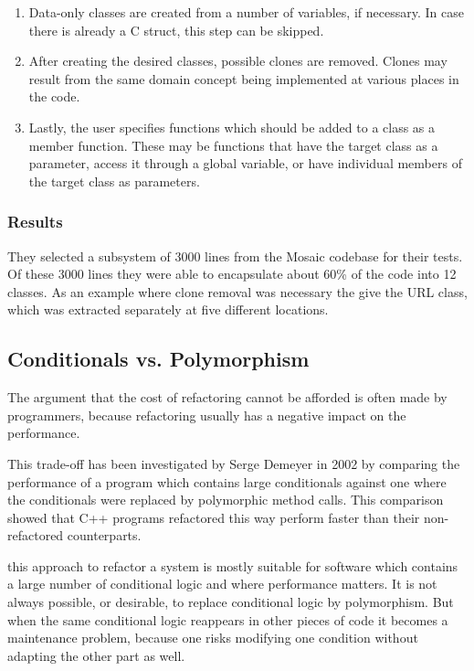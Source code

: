 \documentclass[conference,compsoc,a4paper]{IEEEtran}
\newcommand{\code}[1]{{\small\ttfamily #1}}
\begin{document}
	\begin{enumerate}
		\item Data-only classes are created from a number of variables, if necessary. In case there is already a C 
		\code{struct}, this step can be skipped.
		
		\item After creating the desired classes, possible clones are removed. Clones may result from the same domain concept 
		being implemented at various places in the code.
		
		\item Lastly, the user specifies functions which should be added to a class as a member function. These may be 
		functions that have the target class as a parameter, access it through a global variable, or have individual members 
		of the target class as parameters.
	\end{enumerate}
	
	\subsubsection{Results}
	
	They selected a subsystem of 3000 lines from the Mosaic codebase for their tests. Of these 3000 lines they were able to 
	encapsulate about 60\% of the code into 12 classes. As an example where clone removal was necessary the give the URL 
	class, which was extracted separately at five different locations.
	
	\subsection{Conditionals vs. Polymorphism}
	
	The argument that the cost of refactoring cannot be afforded is often made by programmers, because refactoring usually 
	has a negative impact on the performance.
	
	This trade-off has been investigated by Serge Demeyer in 2002 \cite{polymorphism} by comparing the performance of a 
	program which contains large conditionals against one where the conditionals were replaced by polymorphic method calls. 
	This comparison showed that C++ programs refactored this way perform faster than their non-refactored counterparts.
	
	this approach to refactor a system is mostly suitable for software which contains a large number of conditional logic 
	and where performance matters. It is not always possible, or desirable, to replace conditional logic by polymorphism. 
	But when the same conditional logic reappears in other pieces of code it becomes a maintenance problem, because one 
	risks modifying one condition without adapting the other part as well.
	
\end{document}
